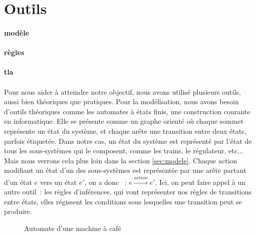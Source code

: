 \documentclass[oneside, a4paper, 11pt]{book}
\begin{document}
\section{Outils}

\paragraph{modèle}
\paragraph{règles}
\paragraph{tla}



\paragraph{}
Pour nous aider à atteindre notre objectif, nous avons utilisé plusieurs outils, aussi bien théoriques que pratiques.
Pour la modélisation, nous avons besoin d'outils théoriques comme les automates à états finis, une construction courante en informatique. Elle se présente comme un graphe orienté
où chaque sommet représente un état du système, et chaque arête une transition entre deux états, parfois étiquetée.
Dans notre cas, un état du système est représenté par l'état de tous les sous-systèmes qui le composent, comme les trains, le régulateur, etc... 
Mais nous verrons cela plus loin dans la section \ref{sec:modele}.
Chaque action modifiant un état d'un des sous-systèmes est représentée par une arête partant d'un état $e$ vers un état $e'$, on a donc ~: $e \xrightarrow{action} e'$.
Ici, on peut faire appel à un autre outil~: les règles d'inférences, qui vont représenter nos règles de transitions entre états, elles régissent les conditions sous lesquelles une transition peut se produire.

\begin{wrapfigure}{r}{0.35\textwidth}
	\centering
	\caption{Automate d'une machine à café}
	\label{fig:cafe}
\end{wrapfigure}
\end{document}

